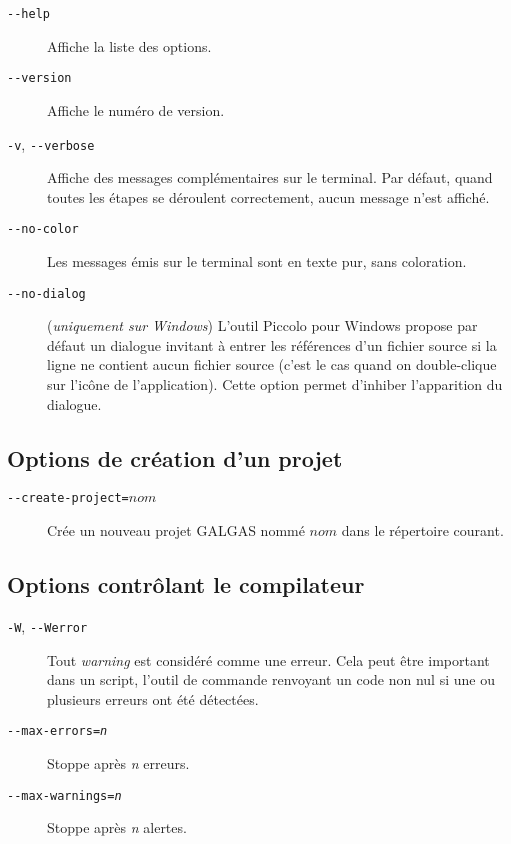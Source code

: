 \begin{description}
  \item[\texttt{-{-}help}] Affiche la liste des options.

  \item[\texttt{-{-}version}] Affiche le numéro de version.

  \item[\texttt{-v}, \texttt{-{-}verbose}] Affiche des messages complémentaires sur le terminal. Par défaut, quand toutes les étapes se déroulent correctement, aucun message n’est affiché.

  \item[\texttt{-{-}no-color}] Les messages émis sur le terminal sont en texte pur, sans coloration.

  \item[\texttt{-{-}no-dialog}] (\emph{uniquement sur Windows}) L’outil Piccolo pour Windows propose par défaut un dialogue invitant à entrer les références d’un fichier source si la ligne ne contient aucun fichier source (c’est le cas quand on double-clique sur l’icône de l’application). Cette option permet d'inhiber l’apparition du dialogue.
\end{description}



\subsection{Options de création d'un projet}

\begin{description}

  \item[\texttt{-{-}create-project=$nom$}] Crée un nouveau projet GALGAS nommé $nom$ dans le répertoire courant.

\end{description}



\subsection{Options contrôlant le compilateur}




\begin{description}

  \item[\texttt{-W}, \texttt{-{-}Werror}] Tout \emph{warning} est considéré comme une erreur. Cela peut être important dans un script, l’outil de commande renvoyant un code non nul si une ou plusieurs erreurs ont été détectées.

  \item[\texttt{-{-}max-errors=\emph{n}}] Stoppe après \emph{n} erreurs.

  \item[\texttt{-{-}max-warnings=\emph{n}}] Stoppe après \emph{n} alertes.

\end{description}



